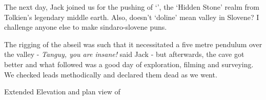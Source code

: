 The next day, Jack joined us for the pushing of `', the `Hidden Stone' realm from Tolkien's legendary middle earth. Also, doesn't `doline' mean valley in Slovene? I challenge anyone else to make sindaro-slovene puns. 

The rigging of the abseil was such that it necessitated a five metre pendulum over the  valley - \textit{Tanguy, you are insane!} said Jack - but afterwards, the cave got better and what followed was a good day of exploration, filming and surveying. We checked leads methodically and declared them dead as we went. 

\begin{pagesurvey}
    \centering
    \caption[Gondolin plan and elevation]{Extended Elevation and plan view of \protect{} }
    \label{}
\end{pagesurvey}



